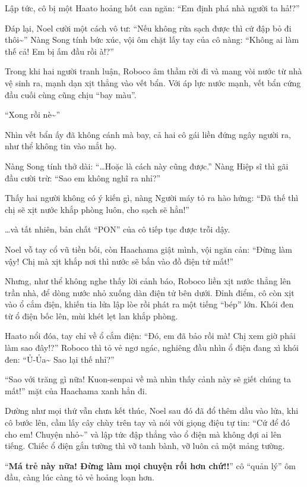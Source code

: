 \documentclass[../main.tex]{subfiles}
\begin{document}
Lập tức, cô bị một Haato hoảng hốt can ngăn: ``Em định phá nhà người ta hả!?''

Đáp lại, Noel cười một cách vô tư: ``Nếu không rửa sạch được thì cứ đập bỏ đi thôi\~{}'' Nàng Song tính bức xúc, vội ôm chặt lấy tay của cô nàng: ``Không ai làm thế cả! Em bị ấm đầu rồi à!?''

Trong khi hai người tranh luận, Roboco âm thầm rời đi và mang vòi nước từ nhà vệ sinh ra, mạnh dạn xịt thẳng vào vết bẩn. Với áp lực nước mạnh, vết bẩn cứng đầu cuối cùng cũng chịu ``bay màu''.

``Xong rồi nè\~{}''

Nhìn vết bẩn ấy đã không cánh mà bay, cả hai cô gái liền đứng ngây người ra, như thể không tin vào mắt họ.

Nàng Song tính thở dài: ``\dots Hoặc là cách này cũng được.'' Nàng Hiệp sĩ thì gãi đầu cười trừ: ``Sao em không nghĩ ra nhỉ?''

Thấy hai người không có ý kiến gì, nàng Người máy tỏ ra hào hứng: ``Đã thế thì chị sẽ xịt nước khắp phòng luôn, cho sạch sẽ hẳn!''

\dots và tất nhiên, bản chất ``PON'' của cô tiếp tục được trỗi dậy.

Noel vỗ tay cổ vũ tiền bối, còn Haachama giật mình, vội ngăn cản: ``Đừng làm vậy! Chị mà xịt khắp nơi thì nước sẽ bắn vào đồ điện tử mất!''

Nhưng, như thể không nghe thấy lời cảnh báo, Roboco liền xịt nước thẳng lên trần nhà, để dòng nước nhỏ xuống dàn điện tử bên dưới. Đỉnh điểm, cô còn xịt vào ổ cắm điện, khiến tia lửa lập lòe rồi phát ra một tiếng ``bép'' lớn. Khói đen từ ổ điện bốc lên, mùi khét lẹt lan khắp phòng.

Haato nổi đóa, tay chỉ về ổ cắm điện: ``Đó, em đã bảo rồi mà! Chị xem giờ phải làm sao đây!?'' Roboco thì tỏ vẻ ngơ ngác, nghiêng đầu nhìn ổ điện đang xì khói đen: ``Ủ-Ủa\~{} Sao lại thế nhỉ?''

``Sao với trăng gì nữa! Kuon-senpai về mà nhìn thấy cảnh này sẽ giết chúng ta mất!'' mặt của Haachama xanh hẳn đi.

Dường như mọi thứ vẫn chưa kết thúc, Noel sau đó đã đổ thêm dầu vào lửa, khi cô bước lên, cầm lấy cây chùy trên tay và nói với giọng điệu tự tin: ``Cứ để đó cho em! Chuyện nhỏ\~{}'' và lập tức đập thẳng vào ổ điện mà không đợi ai lên tiếng. Chiếc ổ điện gắn tường thì vỡ tanh bành, vỡ luôn cả một mảng tường.

``\textbf{Má trẻ này nữa! Đừng làm mọi chuyện rối hơn chứ!!}'' cô ``quản lý'' ôm đầu, càng lúc càng tỏ vẻ hoảng loạn hơn.
\end{document}
